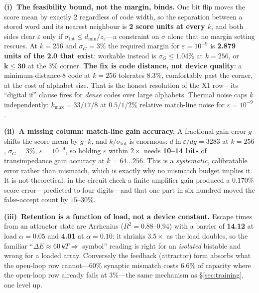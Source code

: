 \documentclass[11pt]{article}
\begin{document}
\textbf{(i)~The feasibility bound, not the margin, binds.} One bit flip moves the score mean by exactly 2 regardless of code width, so the separation between a stored word and its nearest neighbour is \textbf{2 score units at every $k$}, and both sides clear $\varepsilon$ only if $\sigma_{\mathrm{tot}} \le d_{\min}/z_\varepsilon$---a constraint on $\sigma$ alone that no margin setting rescues. At $k=256$ and $\sigma_G = 3\%$ the required margin for $\varepsilon = 10^{-9}$ is \textbf{2.879 units of the 2.0 that exist}; workable instead is $\sigma_G \le 1.04\%$ at $k=256$, or $\mathbf{k \le 30}$ at the $3\%$ corner. \textbf{The fix is code distance, not device quality}: a minimum-distance-8 code at $k=256$ tolerates $8.3\%$, comfortably past the corner, at the cost of alphabet size. That is the honest resolution of the X1 row---its ``digital if'' clause fires for \textit{dense} codes over large alphabets. Thermal noise caps $k$ independently: $k_{\max} = 33/17/8$ at $0.5/1/2\%$ relative match-line noise for $\varepsilon = 10^{-9}$.

\textbf{(ii)~A missing column: match-line gain accuracy.} A fractional gain error $g$ shifts the score mean by $g\cdot k$, and $k/\sigma_{\mathrm{tot}}$ is enormous: $d\ln\varepsilon/dg = 3283$ at $k=256$, $\sigma_G = 3\%$, $\varepsilon = 10^{-9}$, so holding $\varepsilon$ within $2\times$ needs \textbf{10--14 bits} of transimpedance gain accuracy at $k = 64\ldots256$. This is a \textit{systematic}, calibratable error rather than mismatch, which is exactly why no mismatch budget implies it. It is not theoretical: in the circuit check a finite amplifier gain produced a $0.170\%$ score error---predicted to four digits---and that one part in six hundred moved the false-accept count by $15$--$30\%$.

\textbf{(iii)~Retention is a function of load, not a device constant.} Escape times from an attractor state are Arrhenius ($R^2 = 0.88$--$0.94$) with a barrier of \textbf{14.12} at load $\alpha = 0.05$ and \textbf{4.01} at $\alpha = 0.10$: it shrinks $3.5\times$ as the load doubles, so the familiar ``$\Delta E \approx 60\,kT \Rightarrow$ symbol'' reading is right for an \textit{isolated} bistable and wrong for a loaded array. Conversely the feedback (attractor) form absorbs what the open-loop row cannot---$60\%$ synaptic mismatch costs $6.6\%$ of capacity where the open-loop row already fails at $3\%$---the same mechanism as \S\ref{sec:training}, one level up.
\end{document}
